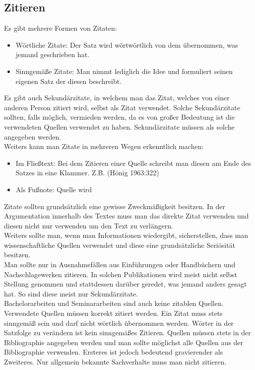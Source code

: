 \documentclass{article}
\begin{document}
	\subsection{Zitieren}
	Es gibt mehrere Formen von Zitaten:
	\begin{itemize}
		\item{Wörtliche Zitate: Der Satz wird wörtwörtlich von dem übernommen, was jemand geschrieben hat.}
		\item{Sinngemäße Zitate: Man nimmt lediglich die Idee und formuliert seinen eigenen Satz der diesen beschreibt.}
	\end{itemize}
	Es gibt auch Sekundärzitate, in welchem man das Zitat, welches von einer anderen Person zitiert wird, selbst als Zitat verwendet. Solche Sekundärzitate sollten, falls möglich, vermieden werden, da es von großer Bedeutung ist die verwendeten Quellen verwendet zu haben. Sekundärzitate müssen als solche angegeben werden. \\
	Weiters kann man Zitate in mehreren Wegen erkenntlich machen:
	\begin{itemize}
		\item{Im Fließtext: Bei dem Zitieren einer Quelle schreibt man diesen am Ende des Satzes in eine Klammer. Z.B. (Hönig 1963:322)}
		\item{Als Fußnote: Quelle wird}
	\end{itemize}
	Zitate sollten grundsätzlich eine gewisse Zweckmäßigkeit besitzen. In der Argumentation innerhalb des Textes muss man das direkte Zitat verwenden und diesen nicht nur verwenden um den Text zu verlängern. \\
	Weiters sollte man, wenn man Informationen wiedergibt, sicherstellen, dass man wissenschaftliche Quellen verwendet und diese eine grundsätzliche Seriösität besitzen. \\
	Man sollte nur in Ausnahmefällen aus Einführungen oder Handbüchern und Nachschlagewerken zitieren. In solchen Publikationen wird meist nicht selbst Stellung genommen und stattdessen darüber geredet, was jemand anders gesagt hat. So sind diese meist nur Sekundärzitate. \\
	Bachelorarbeiten und Seminararbeiten sind auch keine zitablen Quellen. \\
	Verwendete Quellen müssen korrekt zitiert werden. Ein Zitat muss stets sinngemäß sein und darf nicht wörtlich übernommen werden. Wörter in der Satzfolge zu verändern ist kein sinngemäßes Zitieren. Quellen müssen stets in der Bibliographie angegeben werden und man sollte möglichst alle Quellen aus der Bibliographie verwenden. Ersteres ist jedoch bedeutend gravierender als Zweiteres. Nur allgemein bekannte Sachverhalte muss man nicht zitieren. \\
\end{document}
